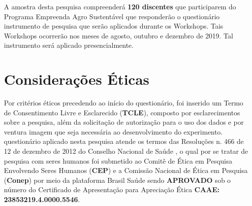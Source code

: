 A amostra desta pesquisa compreenderá \textbf{120 discentes} que participarem do Programa Empreenda Agro Sustentável que responderão o questionário instrumento de pesquisa que serão aplicados durante os Workshops. Tais Workshops ocorrerão nos meses de agosto, outubro e dezembro de 2019. Tal instrumento será aplicado presencialmente. 


\section{Considerações Éticas}

Por critérios éticos precedendo ao início do questionário, foi inserido um Termo de Consentimento Livre e Esclarecido (\textbf{TCLE}), composto por esclarecimentos sobre a pesquisa, além da solicitação de autorização para o uso dos dados e por ventura imagem que seja necessária ao desenvolvimento do experimento. questionário aplicado nesta pesquisa atende os termos das Resoluções n. 466 de 12 de dezembro de 2012 do Conselho Nacional de Saúde \cite{cns_resolucao_2012}, o qual por se tratar de pesquisa com seres humanos foi submetido ao Comitê de Ética em Pesquisa Envolvendo Seres Humanos (\textbf{CEP}) e a Comissão Nacional de Ética em Pesquisa (\textbf{Conep}) por meio da plataforma Brasil Saúde sendo \textbf{APROVADO} sob o número do Certificado de Apresentação para Apreciação Ética \textbf{CAAE: 23853219.4.0000.5546}.




